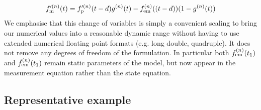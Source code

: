 \documentclass[fleqn,usenatbib,useAMS]{mnras}
\begin{document}
\begin{equation}
	f_{\rm m}^{\prime (n)}(t) = f_{\rm p}^{\prime (n)}(t-d) g^{(n)}(t) -  f_{\rm em}^{(n)}((t-d))(1-g^{(n)}(t))
	\label{eq:measurement_cov}
\end{equation}
We emphasise that this change of variables is simply a convenient scaling to bring our numerical values into a reasonable dynamic range without having to use extended numerical floating point formats (e.g. long double, quadruple). It does not remove any degrees of freedom of the formulation. In particular both $f_{\rm em}^{(n)}(t_1)$
and $\dot{f}_{\rm em}^{(n)}(t_1)$ remain static parameters of the model, but now appear in the measurement equation rather than the state equation.


\subsection{Representative example}\label{sec:rep_example}
\end{document}
